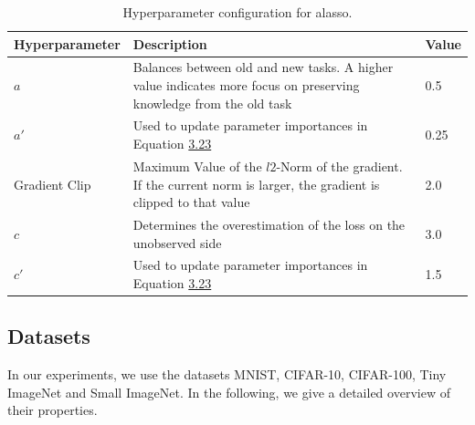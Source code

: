 \begin{table}[!htb]
    \centering
    \begin{tabularx}{\textwidth}{| l | X | l |} 
        \hline
        Hyperparameter & Description & Value \\ 
        \hline 
        \hline
        $a$ & Balances between old and new tasks. A higher value indicates more focus
        on preserving knowledge from the old task & 0.5  \\ 
        \hline
        $a'$ & Used to update parameter importances in Equation \hyperref[eq:ALASSO_Small_Omega]{3.23} & 0.25  \\
        \hline
        Gradient Clip & Maximum Value of the $l2$-Norm of the gradient. If the current norm is larger, the
        gradient is clipped to that value & 2.0 \\ 
        \hline
        $c$ & Determines the overestimation of the loss on the unobserved side & 3.0 \\
        \hline
        $c'$ & Used to update parameter importances in Equation \hyperref[eq:ALASSO_Small_Omega]{3.23} & 1.5 \\
        \hline
    \end{tabularx}
    \caption{Hyperparameter configuration for \gls{alasso}.}
    \label{fig:AlassoParams}
\end{table}

\newpage

\subsection{Datasets}
\label{sec:Appendix:Datasets}
In our experiments, we use the datasets MNIST, CIFAR-10, CIFAR-100, Tiny ImageNet and Small ImageNet. In the following, we give a detailed overview of their properties.

